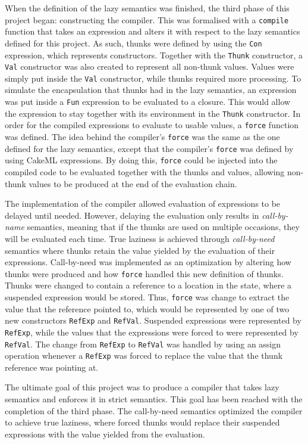 When the definition of the lazy semantics was finished, the third phase of this
project began: constructing the compiler. This was formalised with a
\texttt{compile} function that takes an expression and alters it with respect to
the lazy semantics defined for this project. As such, thunks were defined by
using the \texttt{Con} expression, which represents constructors. Together with
the \texttt{Thunk} constructor, a \texttt{Val} constructor was also created to
represent all non-thunk values. Values were simply put inside the \texttt{Val}
constructor, while thunks required more processing. To simulate the
encapsulation that thunks had in the lazy semantics, an expression was put
inside a \texttt{Fun} expression to be evaluated to a closure. This would allow the
expression to stay together with its environment in the \texttt{Thunk}
constructor. In order for the compiled expressions to evaluate to usable values,
a \texttt{force} function was defined. The idea behind the compiler's
\texttt{force} was the same as the one defined for the lazy semantics, except
that the compiler's \texttt{force} was defined by using CakeML expressions.
By doing this, \texttt{force} could be injected into the compiled code to be
evaluated together with the thunks and values, allowing non-thunk values to be
produced at the end of the evaluation chain.

The implementation of the compiler allowed evaluation of expressions to be
delayed until needed. However, delaying the evaluation only results in
\textit{call-by-name} semantics, meaning that if the thunks are used on multiple
occasions, they will be evaluated each time. True laziness is achieved through
\textit{call-by-need} semantics where thunks retain the value yielded
by the evaluation of their expressions. Call-by-need was implemented as an optimization
by altering how thunks were produced and how \texttt{force} handled this new
definition of thunks. Thunks were changed to contain a reference to a location
in the state, where a suspended expression would be stored. Thus, \texttt{force}
was change to extract the value that the reference pointed to, which would be
represented by one of two new constructors \texttt{RefExp} and \texttt{RefVal}.
Suspended expressions were represented by \texttt{RefExp}, while the values that
the expressions were forced to were represented by \texttt{RefVal}. The change
from \texttt{RefExp} to \texttt{RefVal} was handled by using an assign operation
whenever a \texttt{RefExp} was forced to replace the value that the thunk
reference was pointing at.

The ultimate goal of this project was to produce a compiler that takes lazy
semantics and enforces it in strict semantics. This goal has
been reached with the completion of the third phase. The call-by-need semantics
optimized the compiler to achieve true laziness, where forced thunks
would replace their suspended expressions with the value yielded from
the evaluation.
